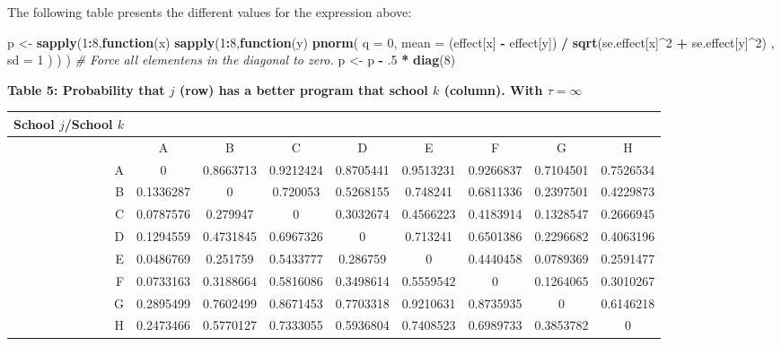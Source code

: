 \documentclass[]{article}
\newenvironment{Shaded}{\begin{snugshade}}{\end{snugshade}}
\newcommand{\KeywordTok}[1]{\textcolor[rgb]{0.13,0.29,0.53}{\textbf{#1}}}
\newcommand{\DataTypeTok}[1]{\textcolor[rgb]{0.13,0.29,0.53}{#1}}
\newcommand{\DecValTok}[1]{\textcolor[rgb]{0.00,0.00,0.81}{#1}}
\newcommand{\StringTok}[1]{\textcolor[rgb]{0.31,0.60,0.02}{#1}}
\newcommand{\CommentTok}[1]{\textcolor[rgb]{0.56,0.35,0.01}{\textit{#1}}}
\newcommand{\ControlFlowTok}[1]{\textcolor[rgb]{0.13,0.29,0.53}{\textbf{#1}}}
\newcommand{\OperatorTok}[1]{\textcolor[rgb]{0.81,0.36,0.00}{\textbf{#1}}}
\newcommand{\NormalTok}[1]{#1}
\begin{document}
The following table presents the different values for the expression
above:

\begin{Shaded}
\begin{Highlighting}[]
\NormalTok{p               <-}\StringTok{ }\KeywordTok{sapply}\NormalTok{(}\DecValTok{1}\OperatorTok{:}\DecValTok{8}\NormalTok{,}\ControlFlowTok{function}\NormalTok{(x) }
                   \KeywordTok{sapply}\NormalTok{(}\DecValTok{1}\OperatorTok{:}\DecValTok{8}\NormalTok{,}\ControlFlowTok{function}\NormalTok{(y) }
                  \KeywordTok{pnorm}\NormalTok{( }\DataTypeTok{q =} \DecValTok{0}\NormalTok{, }\DataTypeTok{mean =}\NormalTok{ (effect[x] }\OperatorTok{-}\StringTok{ }\NormalTok{effect[y]) }\OperatorTok{/}\StringTok{ }\KeywordTok{sqrt}\NormalTok{(se.effect[x]}\OperatorTok{^}\DecValTok{2} \OperatorTok{+}\StringTok{ }\NormalTok{se.effect[y]}\OperatorTok{^}\DecValTok{2}\NormalTok{) , }
                  \DataTypeTok{sd =} \DecValTok{1}\NormalTok{ )}
\NormalTok{                  ) )  }
\CommentTok{# Force all elementens in the diagonal to zero. }
\NormalTok{p               <-}\StringTok{ }\NormalTok{p }\OperatorTok{-}\StringTok{ }\NormalTok{.}\DecValTok{5} \OperatorTok{*}\StringTok{ }\KeywordTok{diag}\NormalTok{(}\DecValTok{8}\NormalTok{)}
\end{Highlighting}
\end{Shaded}

\textbf{Table 5: Probability that \(j\) (row) has a better program that
school \(k\) (column). With \(\tau = \infty\)}

\begin{longtable}[]{@{}rcccccccc@{}}
\toprule
School \(j\)/School \(k\) & & & & & & & &\tabularnewline
\midrule
\endhead
& A & B & C & D & E & F & G & H\tabularnewline
A & 0 & 0.8663713 & 0.9212424 & 0.8705441 & 0.9513231 & 0.9266837 &
0.7104501 & 0.7526534\tabularnewline
B & 0.1336287 & 0 & 0.720053 & 0.5268155 & 0.748241 & 0.6811336 &
0.2397501 & 0.4229873\tabularnewline
C & 0.0787576 & 0.279947 & 0 & 0.3032674 & 0.4566223 & 0.4183914 &
0.1328547 & 0.2666945\tabularnewline
D & 0.1294559 & 0.4731845 & 0.6967326 & 0 & 0.713241 & 0.6501386 &
0.2296682 & 0.4063196\tabularnewline
E & 0.0486769 & 0.251759 & 0.5433777 & 0.286759 & 0 & 0.4440458 &
0.0789369 & 0.2591477\tabularnewline
F & 0.0733163 & 0.3188664 & 0.5816086 & 0.3498614 & 0.5559542 & 0 &
0.1264065 & 0.3010267\tabularnewline
G & 0.2895499 & 0.7602499 & 0.8671453 & 0.7703318 & 0.9210631 &
0.8735935 & 0 & 0.6146218\tabularnewline
H & 0.2473466 & 0.5770127 & 0.7333055 & 0.5936804 & 0.7408523 &
0.6989733 & 0.3853782 & 0\tabularnewline
\bottomrule
\end{longtable}
\end{document}
